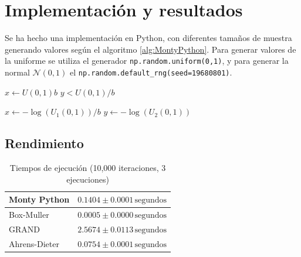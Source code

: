 \section{Implementación y resultados}
Se ha hecho una implementación en Python, con diferentes tamaños de muestra
generando valores según el algoritmo \ref{alg:MontyPython}.
Para generar valores de la uniforme se utiliza el generador \lstinline{np.random.uniform(0,1)}, y para generar
la normal $\mathcal{N}(0,1)$ el \lstinline{np.random.default_rng(seed=19680801)}.
\begin{algorithm}
    \caption{Monty Python}\label{alg:MontyPython}
    \begin{algorithmic}
        \State $x \gets U(0,1)b$
        \EndIf
        \State $y < U(0,1)/b$

        \EndIf
        \EndIf
        \EndWhile
        \State $x \gets - \log(U_1(0,1))/b$
        \State $y \gets - \log(U_2(0,1))$
        \EndIf
        \EndWhile
    \end{algorithmic}
\end{algorithm}

\subsection{Rendimiento}
\begin{table}[ht!]
    \centering
    \begin{tabular}{|l|c|}\hline
        Monty Python  & $0.1404 \pm 0.0001 \,\text{segundos}$ \\\hline
        Box-Muller    & $0.0005 \pm 0.0000 \,\text{segundos}$ \\\hline
        GRAND         & $2.5674 \pm 0.0113 \,\text{segundos}$ \\\hline
        Ahrens-Dieter & $0.0754 \pm 0.0001 \,\text{segundos}$ \\\hline
    \end{tabular}
    \caption{Tiempos de ejecución (10,000 iteraciones, 3 ejecuciones)}
\end{table}

